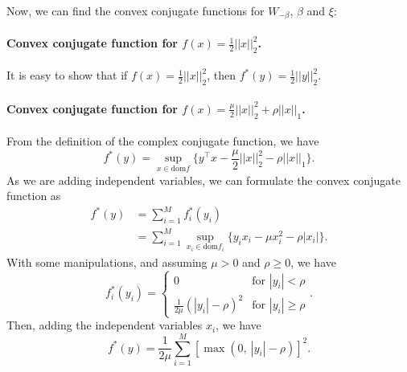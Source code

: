 Now, we can find the convex conjugate functions for $W_{-\beta}$, $\beta$ and $\xi$:

\paragraph{Convex conjugate function for $f(x) = \frac{1}{2}||x||_2^2$.}
It is easy to show that if $f(x) = \frac{1}{2}||x||_2^2$, then $f^*(y) = \frac{1}{2}||y||_2^2$.
\paragraph{Convex conjugate function for $f(x) = \frac{\mu}{2}||x||_2^2 + \rho||x||_1$.}
From the definition of the complex conjugate function, we have 
\begin{equation}
f^*(y) = \sup_{x \in \text{dom$f$}}\{y^\top x-\frac{\mu}{2}||x||_2^2 - \rho||x||_1\} .
\end{equation}
As we are adding independent variables, we can formulate the convex conjugate function as
\begin{equation}
\begin{split}
f^*(y) & = \sum_{i=1}^M f_i^*(y_i) \\
& = \sum_{i=1}^M \sup_{x_i \in \text{dom$f_i$}}\{y_ix_i - \mu x_i^2 - \rho |x_i|\}.
\end{split}
\end{equation}
With some manipulations, and assuming $\mu > 0$ and $\rho \ge 0$,  we have
\begin{equation}
 f_i^*(y_i) = \begin{cases} 0 & \mbox{for } |y_i| <  \rho \\ \frac{1}{2\mu}(|y_i| - \rho)^2 & \mbox{for }|y_i| \ge  \rho \end{cases} .
\end{equation}
Then, adding the independent variables $x_i$, we have
\begin{equation}
f^*(y) = \frac{1}{2\mu} \sum_{i=1}^M \left[\max (0,~|y_i|-\rho)\right]^2.
\end{equation}
